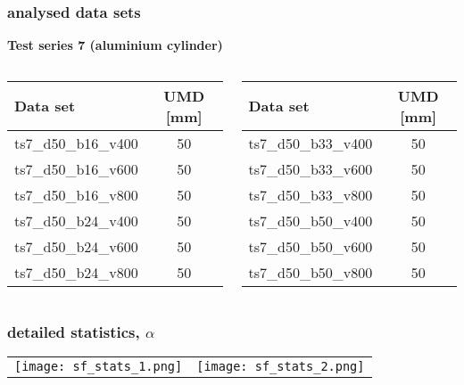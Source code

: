 	\begin{frame}
		\frametitle{\appendixname{} \textendash{} analysed data sets}\label{app:dataset:ts7}
		\textbf{Test series 7 (aluminium cylinder)}\autocite{ts7data}\\
		\vspace*{1em}
		\begin{columns}[t]
			\begin{column}{.5\textwidth}
				\begin{tabular}{l c}
					\toprule
					Data set            & UMD [mm] \\ \midrule
					ts7\_d50\_b16\_v400 & 50       \\
					ts7\_d50\_b16\_v600 & 50       \\
					ts7\_d50\_b16\_v800 & 50       \\
					ts7\_d50\_b24\_v400 & 50       \\
					ts7\_d50\_b24\_v600 & 50       \\
					ts7\_d50\_b24\_v800 & 50       \\ \bottomrule
				\end{tabular}
			\end{column}
			\begin{column}{.5\textwidth}
				\begin{tabular}{l c}
					\toprule
					Data set            & UMD [mm] \\ \midrule
					ts7\_d50\_b33\_v400 & 50       \\
					ts7\_d50\_b33\_v600 & 50       \\
					ts7\_d50\_b33\_v800 & 50       \\
					ts7\_d50\_b50\_v400 & 50       \\
					ts7\_d50\_b50\_v600 & 50       \\
					ts7\_d50\_b50\_v800 & 50       \\ \bottomrule
				\end{tabular}
			\end{column}
		\end{columns}
	\end{frame}

	\def\gw{72mm}
	\begin{frame}
		\frametitle{\appendixname{} \textendash{} detailed statistics, $\alpha$}\label{app:detstats:alpha}
		\begin{tabular}{ r r }
			\texttt{[image: sf\_stats\_1.png]} & 
			\texttt{[image: sf\_stats\_2.png]}
		\end{tabular}
	\end{frame}

